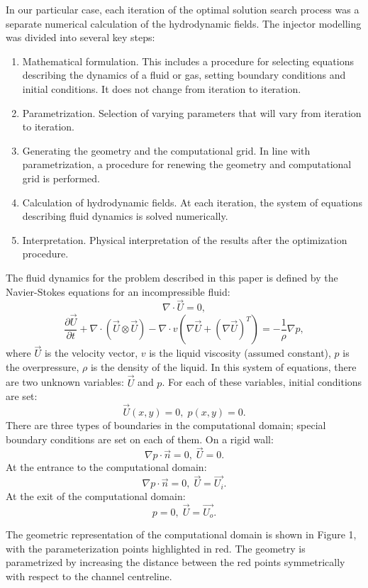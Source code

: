 \documentclass{aip-cp}
\begin{document}
In our particular case, each iteration of the optimal solution search process was a separate numerical calculation of the hydrodynamic fields. The injector modelling was divided into several key steps:
\begin{enumerate}
\item Mathematical formulation. This includes a procedure for selecting equations describing the dynamics of a fluid or gas, setting boundary conditions and initial conditions. It does not change from iteration to iteration.
\item Parametrization. Selection of varying parameters that will vary from iteration to iteration.
\item Generating the geometry and the computational grid. In line with parametrization, a procedure for renewing the geometry and computational grid is performed.
\item Calculation of hydrodynamic fields. At each iteration, the system of equations describing fluid dynamics is solved numerically.
\item Interpretation. Physical interpretation of the results after the optimization procedure.
\end{enumerate}

The fluid dynamics for the problem described in this paper is defined by the Navier-Stokes equations for an incompressible fluid:
\[
\nabla \cdot \vec{U} = 0,
\]
\[
\frac{\partial \vec{U}}{\partial t} + \nabla \cdot \left( \vec{U} \otimes \vec{U}\right) - \nabla \cdot v \left( \nabla \vec{U} + (\nabla \vec{U})^T\right) = - \frac{1}{\rho} \nabla p,
\]
where $\vec{U}$ is the velocity vector, $v$  is the liquid viscosity (assumed constant), $p$  is the overpressure, $\rho$ is the density of the liquid. In this system of equations, there are two unknown variables: $\vec{U}$  and $p$. For each of these variables, initial conditions are set: 
\[
\vec{U}(x,y) = 0, \; p(x,y) = 0.
\]
There are three types of boundaries in the computational domain; special boundary conditions are set on each of them. 
On a rigid wall:
\[
\nabla p \cdot \vec{n} = 0, \; \vec{U} = 0.
\]
At the entrance to the computational domain:
\[
\nabla p \cdot \vec{n} = 0, \; \vec{U} = \vec{U_i}.
\]
At the exit of the computational domain:
\[
 p = 0, \; \vec{U} = \vec{U_o}.
\]

The geometric representation of the computational domain is shown in Figure 1, with the parameterization points highlighted in red. The geometry is parametrized by increasing the distance between the red points symmetrically with respect to the channel centreline. 
\end{document}
